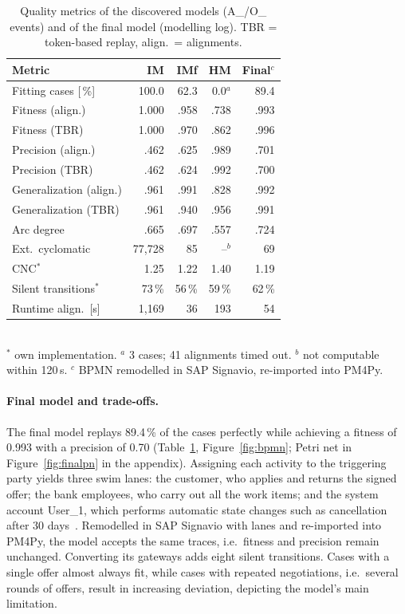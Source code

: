 \documentclass[
  english,        %
  font=times,     %
  twocolumn,      %
]{tumarticle}
\begin{document}
\begin{table}[ht]
  \caption{Quality metrics of the discovered models (A\_/O\_ events) and of
  the final model (modelling log). TBR = token-based replay,
  align.\ = alignments.}
  \centering\small
  \setlength{\tabcolsep}{3pt}
  \renewcommand{\arraystretch}{1.1}
  \begin{tabular}{lrrrr}
    \toprule
    \textbf{Metric} & \textbf{IM} & \textbf{IMf} & \textbf{HM} & \textbf{Final}$^c$ \\
    \midrule
    Fitting cases [\,\%]       & 100.0 & 62.3 & 0.0$^a$ & 89.4 \\
    Fitness (align.)         & 1.000 & .958 & .738 & .993 \\
    Fitness (TBR)            & 1.000 & .970 & .862 & .996 \\
    Precision (align.)       & .462 & .625 & .989 & .701 \\
    Precision (TBR)          & .462 & .624 & .992 & .700 \\
    Generalization (align.)  & .961 & .991 & .828 & .992 \\
    Generalization (TBR)     & .961 & .940 & .956 & .991 \\
    \midrule
    Arc degree               & .665 & .697 & .557 & .724 \\
    Ext.\ cyclomatic         & 77,728 & 85 & --$^b$ & 69 \\
    CNC$^*$                  & 1.25 & 1.22 & 1.40 & 1.19 \\
    Silent transitions$^*$   & 73\,\% & 56\,\% & 59\,\% & 62\,\% \\
    \midrule
    Runtime align.\ [s]      & 1,169 & 36 & 193 & 54 \\
    \bottomrule
  \end{tabular}\\[2pt]
  {\footnotesize $^*$ own implementation. $^a$ 3 cases; 41 alignments timed
  out. $^b$ not computable within 120\,s. $^c$ BPMN remodelled in SAP
  Signavio, re-imported into PM4Py.}
  \label{tab:models}
\end{table}

\paragraph{Final model and trade-offs.}
The final model replays 89.4\,\% of the cases perfectly while achieving a fitness of 0.993 with a precision of 0.70 (Table~\ref{tab:models}, Figure~\ref{fig:bpmn}; Petri net in Figure~\ref{fig:finalpn} in the appendix). Assigning each activity to the triggering party yields three swim lanes: the customer, who applies and returns the signed offer; the bank employees, who carry out all the work items; and the system account User\_1, which performs automatic state changes such as cancellation after 30 days~\cite{rodrigues2017stairway}. Remodelled in SAP Signavio with lanes and re-imported into PM4Py, the model accepts the same traces, i.e.\ fitness and precision remain unchanged. Converting its gateways adds eight silent transitions. Cases with a single offer almost always fit, while cases with repeated negotiations, i.e.\ several rounds of offers, result in increasing deviation, depicting the model's main limitation. 
\end{document}
